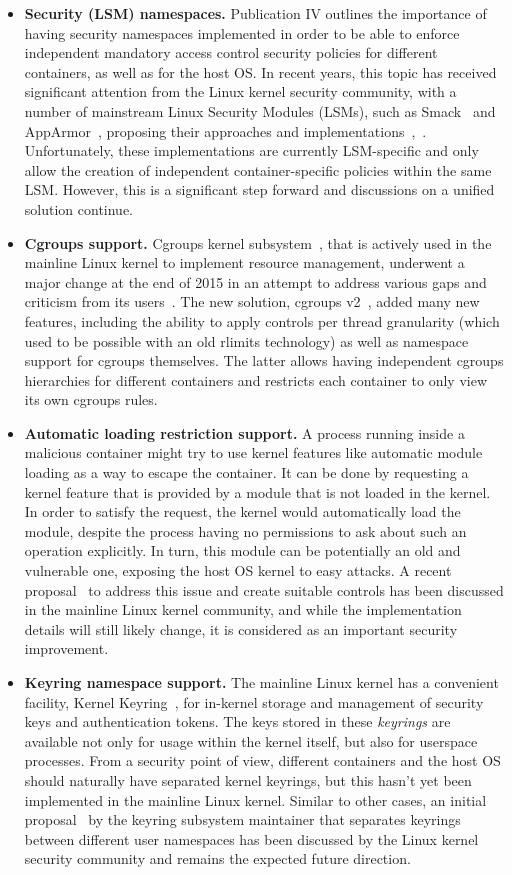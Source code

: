 \begin{itemize}
	\item \textbf{Security (LSM) namespaces.} Publication IV outlines the importance of having security namespaces implemented in order to be able to enforce independent mandatory access control security policies for different containers, as well as for the host OS. In recent years, this topic has received significant attention from the Linux kernel security community, with a number of mainstream Linux Security Modules (LSMs), such as Smack~\cite{smack} and AppArmor~\cite{bauer2006paranoid}, proposing their approaches and implementations~\cite{smackns},~\cite{apparmorns}. Unfortunately, these implementations are currently LSM-specific and only allow the creation of independent container-specific policies within the same LSM. However, this is a significant step forward and discussions on a unified solution continue.
	\item \textbf{Cgroups support.} Cgroups kernel subsystem~\cite{cgroupsv2}, that is actively used in the mainline Linux kernel to implement resource management, underwent a major change at the end of 2015 in an attempt to address various gaps and criticism from its users~\cite{rosen2016}. The new solution, cgroups v2~\cite{cgroupsv2}, added many new features, including the ability to apply controls per thread granularity (which used to be possible with an old rlimits technology) as well as namespace support for cgroups themselves. The latter allows having independent cgroups hierarchies for different containers and restricts each container to only view its own cgroups rules. 
	\item \textbf{Automatic loading restriction support.} A process running inside a malicious container might try to use kernel features like automatic module loading as a way to escape the container. It can be done by requesting a kernel feature that is provided by a module that is not loaded in the kernel. In order to satisfy the request, the kernel would automatically load the module, despite the process having no permissions to ask about such an operation explicitly. In turn, this module can be potentially an old and vulnerable one, exposing the host OS kernel to easy attacks. A recent proposal~\cite{harouni2017} to address this issue and create suitable controls has been discussed in the mainline Linux kernel community, and while the implementation details will still likely change, it is considered as an important security improvement. 
  \item \textbf{Keyring namespace support.} The mainline Linux kernel has a convenient facility, Kernel Keyring~\cite{keyrings}, for in-kernel storage and management of security keys and authentication tokens. The keys stored in these \textit{keyrings} are available not only for usage within the kernel itself, but also for userspace processes. From a security point of view, different containers and the host OS should naturally have separated kernel keyrings, but this hasn't yet been implemented in the mainline Linux kernel. Similar to other cases, an initial proposal~\cite{howells2016} by the keyring subsystem maintainer that separates keyrings between different user namespaces has been discussed by the Linux kernel security community and remains the expected future direction. 

\end{itemize}
